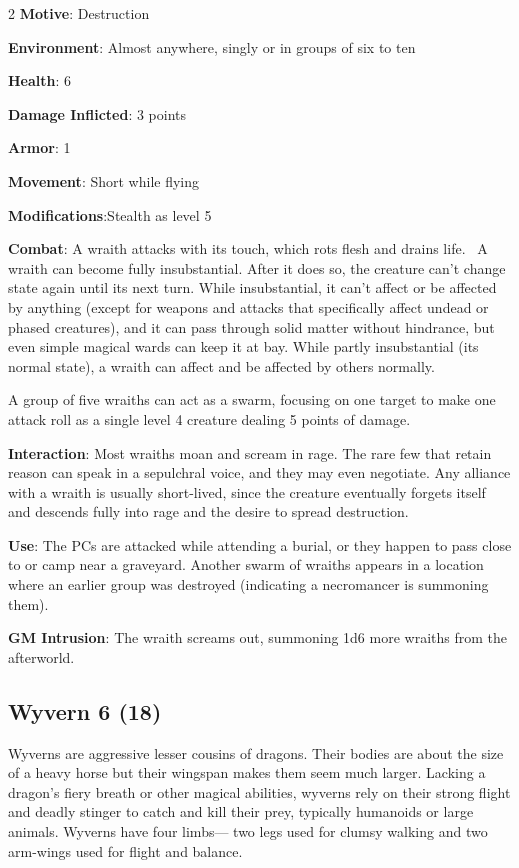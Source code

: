 \begin{multicols}{2}
\textbf{Motive}: Destruction 

\textbf{Environment}: Almost anywhere, singly or in groups of six to ten 

\textbf{Health}: 6 

\textbf{Damage Inflicted}: 3 points 

\textbf{Armor}: 1 

\textbf{Movement}: Short while flying 

\textbf{Modifications}:Stealth as level 5 

\textbf{Combat}: A wraith attacks with its touch, which rots flesh and drains life. 
A wraith can become fully insubstantial. After it does so, the creature can’t change state again until its next turn. While insubstantial, it can’t affect or be affected by anything (except for weapons and attacks that specifically affect undead or phased creatures), and it can pass through solid matter without hindrance, but even simple magical wards can keep it at bay. While partly insubstantial (its normal state), a wraith can affect and be affected by others normally. 

A group of five wraiths can act as a swarm, focusing on one target to make one attack roll as a single level 4 creature dealing 5 points of damage. 

\textbf{Interaction}: Most wraiths moan and scream in rage. The rare few that retain reason can speak in a sepulchral voice, and they may even negotiate. Any alliance with a wraith is usually short-lived, since the creature eventually forgets itself and descends fully into rage and the desire to spread destruction. 

\textbf{Use}: The PCs are attacked while attending a burial, or they happen to pass close to or camp near a graveyard. Another swarm of wraiths appears in a location where an earlier group was destroyed (indicating a necromancer is summoning them).

\textbf{GM Intrusion}: The wraith screams out, summoning 1d6 more wraiths from the afterworld.

\subsection{Wyvern 6 (18)}

Wyverns are aggressive lesser cousins of dragons. Their bodies are about the size of a heavy horse but their wingspan makes them seem much larger. Lacking a dragon’s fiery breath or other magical abilities, wyverns rely on their strong flight and deadly stinger to catch and kill their prey, typically humanoids or large animals. Wyverns have four limbs— two legs used for clumsy walking and two arm-wings used for flight and balance. 


\end{multicols}
